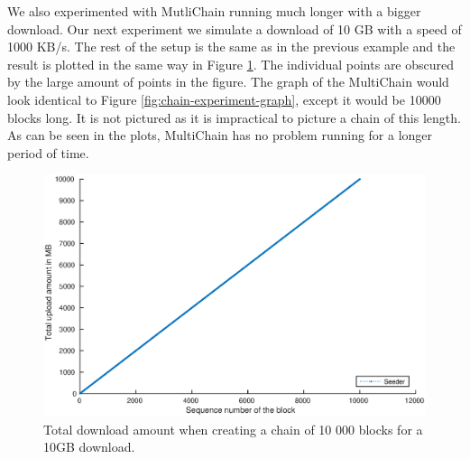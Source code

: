 We also experimented with MutliChain running much longer with a bigger download.
Our next experiment we simulate a download of 10 GB with a speed of 1000 KB/s.
The rest of the setup is the same as in the previous example
and the result is plotted in the same way in Figure \ref{fig:chain-experiment-amounts-long}.
The individual points are obscured by the large amount of points in the figure.
The graph of the MultiChain would look identical to Figure \ref{fig:chain-experiment-graph},
except it would be 10000 blocks long.
It is not pictured as it is impractical to picture a chain of this length.
As can be seen in the plots, MultiChain has no problem running for a longer period of time.

\begin{figure}
\centerline{\includegraphics[scale=0.5]{experimentation/chain/long/chain-down.eps}}
\caption{Total download amount when creating a chain of 10 000 blocks for a 10GB download.}
\label{fig:chain-experiment-amounts-long}
\end{figure}